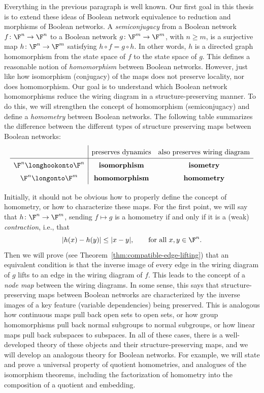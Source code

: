 Everything in the previous paragraph is well known. Our first goal in this thesis is to extend these ideas of Boolean network equivalence to reduction and morphisms of Boolean networks. A \emph{semiconjugacy} from a Boolean network $f\colon\F^n\to\F^n$ to a Boolean network $g\colon\F^m\to\F^m$, with $n\geq m$, is a surjective map $h\colon\F^n\to\F^m$ satisfying $h\circ f=g\circ h$. In other words, $h$ is a directed graph homomorphism from the state space of $f$ to the state space of $g$. This defines a reasonable notion of \emph{homomorphism} between Boolean networks. However, just like how isomorphism (conjugacy) of the maps does not preserve locality, nor does homomorphism.  Our goal is to understand which Boolean network homomorphisms reduce the wiring diagram in a structure-preserving manner. To do this, we will strengthen the concept of homomorphism (semiconjugacy) and define a \emph{homometry} between Boolean networks. The following table summarizes the difference between the different types of structure preserving maps between Boolean networks:
\[
\renewcommand{\arraystretch}{1.5}
\begin{array}{c|cc}
& \text{preserves dynamics} & \text{also preserves wiring diagram} \\ \hline
\F^n\longhookonto\F^n & \textbf{isomorphism} & \textbf{isometry} \\
\F^n\longonto\F^m & \textbf{homomorphism} & \textbf{homometry}\\
\end{array}
\]


Initially, it should not be obvious how to properly define the concept of homometry, or how to characterize these maps. For the first point, we will say that $h\colon\F^n\to\F^m$, sending $f\mapsto g$ is a homometry if and only if it is a (weak) \emph{contraction}, i.e., that
\[
|h(x)-h(y)|\leq |x-y|,\qquad \text{for all $x,y\in\F^n$}.
\]
Then we will prove (see Theorem~\ref{thm:compatible-edge-lifting}) that an equivalent condition is that the inverse image of every edge in the wiring diagram of $g$ lifts to an edge in the wiring diagram of $f$. This leads to the concept of a \emph{node map} between the wiring diagrams. In some sense, this says that structure-preserving maps between Boolean networks are characterized by the inverse images of a key feature (variable dependencies) being preserved. This is analogous how continuous maps pull back open sets to open sets, or how group homomorphisms pull back normal subgroups to normal subgroups, or how linear maps pull back subspaces to subspaces. In all of these cases, there is a well-developed theory of these objects and their structure-preserving maps, and we will develop an analogous theory for Boolean networks. For example, we will state and prove a universal property of quotient homometries, and analogues of the isomorphism theorems, including the factorization of homometry into the composition of a quotient and embedding.


